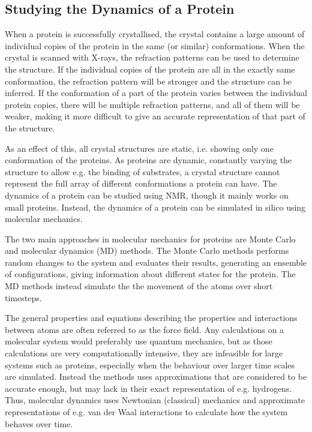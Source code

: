 \documentclass[a4paper, twoside, 12pt, openright]{report}
\begin{document}
\subsection{Studying the Dynamics of a Protein}
\label{sec:prot_dyn}

When a protein is successfully crystallised, the crystal contains a large amount of individual copies of the protein in the same (or similar) conformations. When the crystal is scanned with X-rays, the refraction patterns can be used to determine the structure. If the individual copies of the protein are all in the exactly same conformation, the refraction pattern will be stronger and the structure can be inferred. If the conformation of a part of the protein varies between the individual protein copies, there will be multiple refraction patterns, and all of them will be weaker, making it more difficult to give an accurate representation of that part of the structure.

As an effect of this, all crystal structures are static, i.e. showing only one conformation of the proteins. As proteins are dynamic, constantly varying the structure to allow e.g. the binding of substrates, a crystal structure cannot represent the full array of different conformations a protein can have. The dynamics of a protein can be studied using NMR, though it mainly works on small proteins. Instead, the dynamics of a protein can be simulated in silico using molecular mechanics.

The two main approaches in molecular mechanics for proteins are Monte Carlo and molecular dynamics (MD)  methods. The Monte Carlo methods performs random changes to the system and evaluates their results, generating an ensemble of configurations, giving information about different states for the protein\cite{paquet_molecular_2015}. The MD methods instead simulate the the movement of the atoms over short timesteps.

The general properties and equations describing the properties and interactions between atoms are often referred to as the force field. Any calculations on a molecular system would preferably use quantum mechanics, but as those calculations are very computationally intensive, they are infeasible for large systems such as proteins, especially when the behaviour over larger time scales are simulated. Instead the methods uses approximations that are considered to be accurate enough, but may lack in their exact representation of e.g. hydrogens. Thus, molecular dynamics uses Newtonian (classical) mechanics and approximate representations of e.g. van der Waal interactions to calculate how the system behaves over time.
\end{document}
